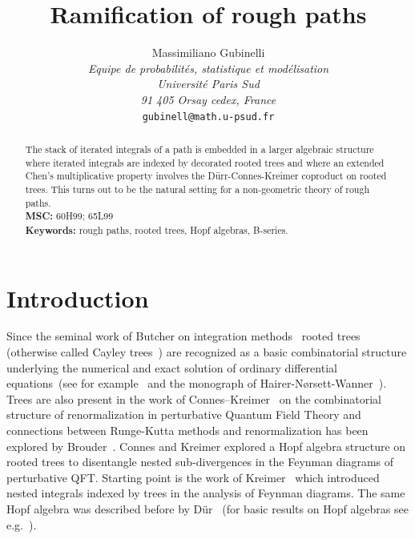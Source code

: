 \documentclass[a4paper,11pt,reqno]{article}
\newcommand{\1}{{\bf 1}}
\begin{document}
\title{Ramification of rough paths}
\author{
  { Massimiliano Gubinelli}              \\
{\small\it Equipe de probabilit\'es, statistique et mod\'elisation }\\[-0.1cm]
  {\small\it  Universit\'e Paris Sud}          \\[-0.1cm]
{\small \it 91 405 Orsay cedex, France}\\[-0.1cm] 
 {\small  {\tt gubinell@math.u-psud.fr}}   
}
\date{}
\maketitle


\begin{abstract}
The stack of iterated integrals of a path 
 is embedded in a larger algebraic structure where
iterated integrals are indexed by decorated rooted trees and where an
extended Chen's multiplicative property involves the
D\"urr-Connes-Kreimer coproduct on rooted trees.
This turns out to be the natural setting for a non-geometric theory of
rough paths. \\[0.1cm]

\noindent\textbf{MSC:} 60H99; 65L99\\
\textbf{Keywords:} rough paths, rooted trees,  Hopf algebras, B-series.
\end{abstract}


\section{Introduction}

Since the seminal work of Butcher on integration
methods~\cite{MR1993957,MR0305608} rooted trees (otherwise called
Cayley trees~\cite{Cayley:1881fk}) are recognized as a basic
combinatorial structure underlying the numerical and exact solution of
ordinary differential equations~(see for example~\cite{MR0403225}  and the monograph of
Hairer-N\o rsett-Wanner~\cite{MR1227985,MR0403225}). Trees are also
present in the work of Connes--Kreimer~\cite{MR1660199,MR1748177,MR1810779} on the combinatorial
structure of renormalization in perturbative Quantum Field Theory  and connections
between Runge-Kutta methods and renormalization has been explored by
Brouder~\cite{MR2106008,brouder1}. Connes and Kreimer explored a
Hopf algebra 
structure on rooted trees  to disentangle nested sub-divergences in the Feynman diagrams of perturbative QFT. Starting point is the work of Kreimer~\cite{MR1633004,MR1797019} which introduced nested integrals indexed by trees in the analysis of Feynman diagrams. The same Hopf algebra was described before by D\"ur~\cite{MR857100} (for basic results on Hopf algebras see
e.g.~\cite{MR0252485}).
\end{document}
